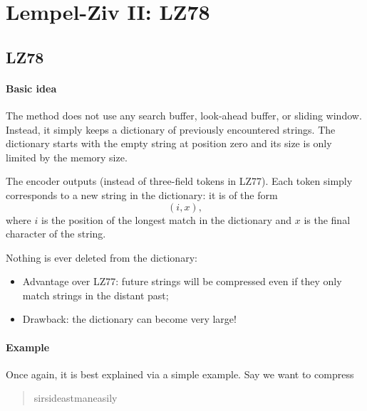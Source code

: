 \documentclass[a4paper, 11pt, openany]{book}
\begin{document}
\section{Lempel-Ziv II: LZ78}
\label{sec:04}


\subsection{LZ78}

\paragraph{Basic idea} The  method does not use any search buffer, look-ahead buffer, or sliding window. Instead, it simply keeps a dictionary of previously encountered strings. The dictionary starts with the empty string at position zero and its size is only limited by the memory size.

The encoder outputs  (instead of three-field tokens in LZ77). Each token simply corresponds to a new string in the dictionary: it is of the form
\[
    (i, x),
\]
where $i$ is the position of the longest match in the dictionary and $x$ is the final character of the string.

Nothing is ever deleted from the dictionary:
\begin{itemize}
    \item Advantage over LZ77: future strings will be compressed even if they only match strings in the distant past;

    \item Drawback: the dictionary can become very large!
\end{itemize}

\paragraph{Example} Once again, it is best explained via a simple example. Say we want to compress
\begin{quote}
    sir\textvisiblespace sid\textvisiblespace eastman\textvisiblespace easily%
\end{quote}
\end{document}

